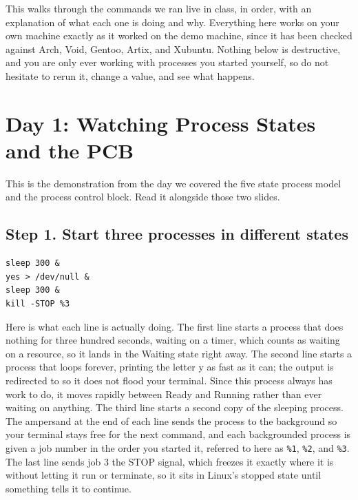 \documentclass[11pt]{article}
\begin{document}

\noindent
This walks through the commands we ran live in class, in order, with an explanation of what each one is doing and why. Everything here works on your own machine exactly as it worked on the demo machine, since it has been checked against Arch, Void, Gentoo, Artix, and Xubuntu. Nothing below is destructive, and you are only ever working with processes you started yourself, so do not hesitate to rerun it, change a value, and see what happens.


\section{Day 1: Watching Process States and the PCB}

This is the demonstration from the day we covered the five state process model and the process control block. Read it alongside those two slides.

\subsection*{Step 1. Start three processes in different states}

\begin{lstlisting}
sleep 300 &
yes > /dev/null &
sleep 300 &
kill -STOP %3
\end{lstlisting}

Here is what each line is actually doing. The first line starts a process that does nothing for three hundred seconds, waiting on a timer, which counts as waiting on a resource, so it lands in the Waiting state right away. The second line starts a process that loops forever, printing the letter y as fast as it can; the output is redirected to  so it does not flood your terminal. Since this process always has work to do, it moves rapidly between Ready and Running rather than ever waiting on anything. The third line starts a second copy of the sleeping process. The ampersand at the end of each line sends the process to the background so your terminal stays free for the next command, and each backgrounded process is given a job number in the order you started it, referred to here as \texttt{\%1}, \texttt{\%2}, and \texttt{\%3}. The last line sends job 3 the STOP signal, which freezes it exactly where it is without letting it run or terminate, so it sits in Linux's stopped state until something tells it to continue.
\end{document}
